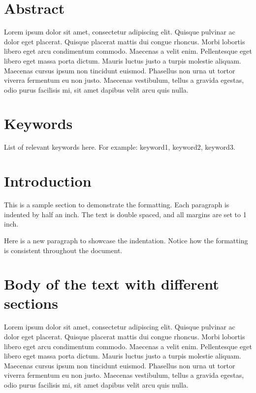 \documentclass[12pt]{article}
\begin{document}
\section*{Abstract} %
Lorem ipsum dolor sit amet, consectetur adipiscing elit. Quisque pulvinar ac dolor eget placerat. Quisque placerat mattis dui congue rhoncus. Morbi lobortis libero eget arcu condimentum commodo. Maecenas a velit enim. Pellentesque eget libero eget massa porta dictum. Mauris luctus justo a turpis molestie aliquam. Maecenas cursus ipsum non tincidunt euismod. Phasellus non urna ut tortor viverra fermentum eu non justo. Maecenas vestibulum, tellus a gravida egestas, odio purus facilisis mi, sit amet dapibus velit arcu quis nulla. 

\section*{Keywords} %
List of relevant keywords here. For example: keyword1, keyword2, keyword3.

\newpage
\tableofcontents %
\newpage


\section{Introduction}
This is a sample section to demonstrate the formatting. Each paragraph is indented by half an inch. The text is double spaced, and all margins are set to 1 inch.

Here is a new paragraph to showcase the indentation. Notice how the formatting is consistent throughout the document.


\section{Body of the text with different sections}
 Lorem ipsum dolor sit amet, consectetur adipiscing elit. Quisque pulvinar ac dolor eget placerat. Quisque placerat mattis dui congue rhoncus. Morbi lobortis libero eget arcu condimentum commodo. Maecenas a velit enim. Pellentesque eget libero eget massa porta dictum. Mauris luctus justo a turpis molestie aliquam. Maecenas cursus ipsum non tincidunt euismod. Phasellus non urna ut tortor viverra fermentum eu non justo. Maecenas vestibulum, tellus a gravida egestas, odio purus facilisis mi, sit amet dapibus velit arcu quis nulla.
\end{document}
